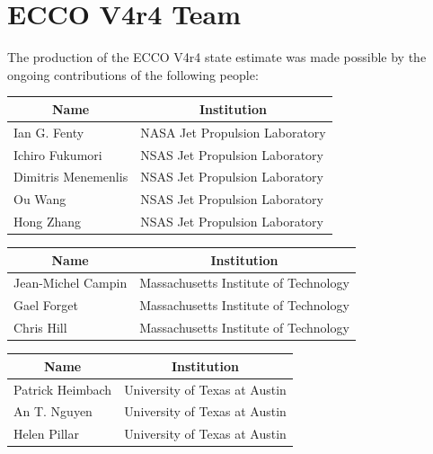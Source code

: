 \pagebreak
\section{ECCO V4r4 Team}
The production of the ECCO V4r4 state estimate was made possible by the ongoing contributions of the following people:

\vspace{.5cm}

\vspace{.25cm}
\begin{center}
\begin{tabular}{ m{} m{}}
    \multicolumn{1}{c}{\textbf{Name}} & \multicolumn{1}{c}{\textbf{Institution}} \\ \hline
    Ian G. Fenty & NASA Jet Propulsion Laboratory\\ \hline
    Ichiro Fukumori & NSAS Jet Propulsion Laboratory \\ \hline
    Dimitris Menemenlis & NSAS Jet Propulsion Laboratory\\ \hline
    Ou Wang & NSAS Jet Propulsion Laboratory \\ \hline
    Hong Zhang & NSAS Jet Propulsion Laboratory\\ \hline
\end{tabular}
\end{center}

\vspace{.25cm}

\vspace{.25cm}
\begin{center}
\begin{tabular}{m{} m{} }
    \multicolumn{1}{c}{\textbf{Name}} & \multicolumn{1}{c}{\textbf{Institution}} \\ \hline
    Jean-Michel Campin & Massachusetts Institute of Technology \\ \hline
    Gael Forget & Massachusetts Institute of Technology \\ \hline
    Chris Hill & Massachusetts Institute of Technology \\ \hline
\end{tabular}
\end{center}

\vspace{.25cm}

\vspace{.25cm}
\begin{center}
\begin{tabular}{m{} m{} }
    \multicolumn{1}{c}{\textbf{Name}} & \multicolumn{1}{c}{\textbf{Institution}} \\ \hline
    Patrick Heimbach & University of Texas at Austin \\ \hline
    An T. Nguyen & University of Texas at Austin \\ \hline
    Helen Pillar & University of Texas at Austin \\ \hline
\end{tabular}
\end{center}

